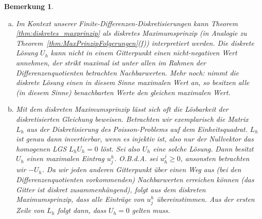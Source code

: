 \documentclass[12pt,a4paper]{book}
\theoremstyle{break}
\newtheorem{bemerkung}[theorem]{Bemerkung}
\theoremstyle{nonumberplain}
\newcommand{\1}{\mathbbm{1}} 			      	%
\begin{document}
\begin{bemerkung}
\begin{enumerate}[(a)]
\item
Im Kontext unserer Finite-Differenzen-Diskretisierungen kann Theorem \ref{thm:diskretes_maxprinzip}
als \emph{diskretes Maximumsprinzip} (in Analogie zu Theorem~\ref{thm:MaxPrinzipFolgerungen}(f)) interpretiert werden.
Die diskrete Lösung $U_h$ kann nicht in einem Gitterpunkt einen nicht-negativen Wert annehmen, der strikt maximal ist unter
allen im Rahmen der Differenzenquotienten betrachten Nachbarwerten. Mehr noch: nimmt die diskrete Lösung
einen in diesem Sinne maximalen Wert an, so besitzen alle (in diesem Sinne) benachbarten Werte den gleichen maximalen Wert.
%
\item Mit dem diskreten Maximumsprinzip lässt sich oft die Lösbarkeit der diskretisierten Gleichung beweisen. Betrachten wir exemplarisch die Matrix
$L_h$ aus der Diskretisierung des Poisson-Problems auf dem Einheitsquadrat. $L_h$ ist genau dann invertierbar, 
wenn es injektiv ist,
also nur der Nullvektor das homogenen LGS $L_h U_h=0$ löst. Sei also $U_h$ eine solche Lösung. 
Dann besitzt $U_h$ einen maximalen Eintrag $u^h_j$.
O.B.d.A. sei $u_h^j\geq 0$, ansonsten betrachten wir $-U_h$. 
Da wir jeden anderen Gitterpunkt über einen Weg aus (bei den Differenzenquotienten vorkommenden)
Nachbarwerten erreichen können (das Gitter ist \emph{diskret zusammenhängend}), folgt aus dem diskreten Maximumsprinzip, dass alle Einträge von 
$u^h_j$ übereinstimmen. Aus der ersten Zeile von $L_h$ folgt dann, dass $U_h=0$ gelten muss.
\end{enumerate}
\end{bemerkung}
\end{document}
